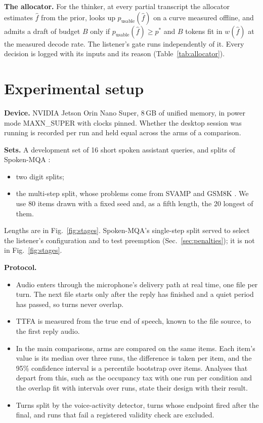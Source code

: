 \documentclass[a4paper,10pt,twocolumn]{article}
\begin{document}
\textbf{The allocator.} For the thinker, at every partial transcript the
allocator estimates $\hat f$ from the prior, looks up $p_{\mathrm{usable}}(\hat f)$
on a curve measured offline, and admits a draft of budget $B$ only if
$p_{\mathrm{usable}}(\hat f) \ge p^\ast$ and $B$ tokens fit in $w(\hat f)$ at
the measured decode rate. The listener's gate runs independently of it.
Every decision is logged with its inputs and its reason
(Table~\ref{tab:allocator}).

\section{Experimental setup}
\label{sec:setup}

\textbf{Device.} NVIDIA Jetson Orin Nano Super, 8\,GB of unified memory, in
power mode MAXN\_SUPER with clocks pinned. Whether the desktop session was
running is recorded per run and held equal across the arms of a comparison.

\textbf{Sets.} A development set of 16 short spoken assistant queries, and
splits of Spoken-MQA \cite{wei2025towards}:
\begin{itemize}
\item two digit splits;
\item the multi-step split, whose problems come from SVAMP
  \cite{patel2021svamp} and GSM8K \cite{cobbe2021gsm8k}. We use 80
  items drawn with a fixed seed and, as a fifth length, the 20 longest of
  them.
\end{itemize}
Lengths are in Fig.~\ref{fig:stages}. Spoken-MQA's single-step split served
to select the listener's configuration and to test preemption
(Sec.~\ref{sec:penalties}); it is not in Fig.~\ref{fig:stages}.

\textbf{Protocol.}
\begin{itemize}
\item Audio enters through the microphone's delivery path at real time, one
  file per turn. The next file starts only after the reply has finished and a
  quiet period has passed, so turns never overlap.
\item TTFA is measured from the true end of speech, known to the file source,
  to the first reply audio.
\item In the main comparisons, arms are compared on the same items. Each
  item's value is its median over three runs, the difference is taken per
  item, and the 95\% confidence interval is a percentile bootstrap over items.
  Analyses that depart from this, such as the occupancy tax with one run per
  condition and the overlap fit with intervals over runs, state their design
  with their result.
\item Turns split by the voice-activity detector, turns whose endpoint fired
  after the final, and runs that fail a registered validity check are
  excluded.
\end{itemize}
\end{document}
